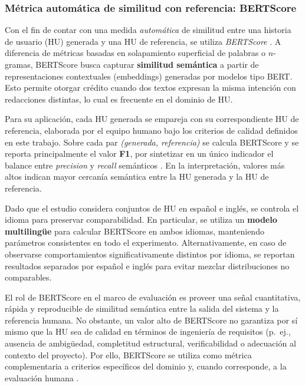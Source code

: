 \subsubsection{Métrica automática de similitud con referencia: BERTScore}
\label{sec:bertscore}

Con el fin de contar con una medida \textit{automática} de similitud entre una historia de usuario (HU) generada y una HU de referencia, se utiliza \textit{BERTScore} \cite{zhang2020bertscore}. A diferencia de métricas basadas en solapamiento superficial de palabras o $n$-gramas, BERTScore busca capturar \textbf{similitud semántica} a partir de representaciones contextuales (embeddings) generadas por modelos tipo BERT. Esto permite otorgar crédito cuando dos textos expresan la misma intención con redacciones distintas, lo cual es frecuente en el dominio de HU.

Para su aplicación, cada HU generada se empareja con su correspondiente HU de referencia, elaborada por el equipo humano bajo los criterios de calidad definidos en este trabajo. Sobre cada par \textit{(generada, referencia)} se calcula BERTScore y se reporta principalmente el valor \textbf{F1}, por sintetizar en un único indicador el balance entre \textit{precision} y \textit{recall} semánticos \cite{zhang2020bertscore}. En la interpretación, valores más altos indican mayor cercanía semántica entre la HU generada y la HU de referencia.

Dado que el estudio considera conjuntos de HU en español e inglés, se controla el idioma para preservar comparabilidad. En particular, se utiliza un \textbf{modelo multilingüe} para calcular BERTScore en ambos idiomas, manteniendo parámetros consistentes en todo el experimento. Alternativamente, en caso de observarse comportamientos significativamente distintos por idioma, se reportan resultados separados por español e inglés para evitar mezclar distribuciones no comparables.

El rol de BERTScore en el marco de evaluación es proveer una señal cuantitativa, rápida y reproducible de similitud semántica entre la salida del sistema y la referencia humana. No obstante, un valor alto de BERTScore no garantiza por sí mismo que la HU sea de calidad en términos de ingeniería de requisitos (p.\ ej., ausencia de ambigüedad, completitud estructural, verificabilidad o adecuación al contexto del proyecto). Por ello, BERTScore se utiliza como métrica complementaria a criterios específicos del dominio y, cuando corresponde, a la evaluación humana \cite{yu2026evaluating_genai_quality_multicase}.

